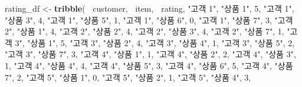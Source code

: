 \documentclass[]{book}
\newenvironment{Shaded}{\begin{snugshade}}{\end{snugshade}}
\newcommand{\DecValTok}[1]{\textcolor[rgb]{0.00,0.00,0.81}{#1}}
\newcommand{\KeywordTok}[1]{\textcolor[rgb]{0.13,0.29,0.53}{\textbf{#1}}}
\newcommand{\NormalTok}[1]{#1}
\newcommand{\OperatorTok}[1]{\textcolor[rgb]{0.81,0.36,0.00}{\textbf{#1}}}
\newcommand{\StringTok}[1]{\textcolor[rgb]{0.31,0.60,0.02}{#1}}
\begin{document}
\begin{Shaded}
\begin{Highlighting}[]
\NormalTok{rating_df <-}\StringTok{ }\KeywordTok{tribble}\NormalTok{(}
  \OperatorTok{~}\NormalTok{customer, }\OperatorTok{~}\NormalTok{item, }\OperatorTok{~}\NormalTok{rating,}
  \StringTok{"고객 1"}\NormalTok{, }\StringTok{"상품 1"}\NormalTok{, }\DecValTok{5}\NormalTok{,}
  \StringTok{"고객 1"}\NormalTok{, }\StringTok{"상품 3"}\NormalTok{, }\DecValTok{4}\NormalTok{,}
  \StringTok{"고객 1"}\NormalTok{, }\StringTok{"상품 5"}\NormalTok{, }\DecValTok{1}\NormalTok{,}
  \StringTok{"고객 1"}\NormalTok{, }\StringTok{"상품 6"}\NormalTok{, }\DecValTok{0}\NormalTok{,}
  \StringTok{"고객 1"}\NormalTok{, }\StringTok{"상품 7"}\NormalTok{, }\DecValTok{3}\NormalTok{,}
  \StringTok{"고객 2"}\NormalTok{, }\StringTok{"상품 1"}\NormalTok{, }\DecValTok{4}\NormalTok{,}
  \StringTok{"고객 2"}\NormalTok{, }\StringTok{"상품 2"}\NormalTok{, }\DecValTok{4}\NormalTok{,}
  \StringTok{"고객 2"}\NormalTok{, }\StringTok{"상품 3"}\NormalTok{, }\DecValTok{4}\NormalTok{,}
  \StringTok{"고객 2"}\NormalTok{, }\StringTok{"상품 7"}\NormalTok{, }\DecValTok{1}\NormalTok{,}
  \StringTok{"고객 3"}\NormalTok{, }\StringTok{"상품 1"}\NormalTok{, }\DecValTok{5}\NormalTok{,}
  \StringTok{"고객 3"}\NormalTok{, }\StringTok{"상품 2"}\NormalTok{, }\DecValTok{4}\NormalTok{,}
  \StringTok{"고객 3"}\NormalTok{, }\StringTok{"상품 4"}\NormalTok{, }\DecValTok{1}\NormalTok{,}
  \StringTok{"고객 3"}\NormalTok{, }\StringTok{"상품 5"}\NormalTok{, }\DecValTok{2}\NormalTok{,}
  \StringTok{"고객 3"}\NormalTok{, }\StringTok{"상품 7"}\NormalTok{, }\DecValTok{3}\NormalTok{,}
  \StringTok{"고객 4"}\NormalTok{, }\StringTok{"상품 1"}\NormalTok{, }\DecValTok{1}\NormalTok{,}
  \StringTok{"고객 4"}\NormalTok{, }\StringTok{"상품 2"}\NormalTok{, }\DecValTok{2}\NormalTok{,}
  \StringTok{"고객 4"}\NormalTok{, }\StringTok{"상품 3"}\NormalTok{, }\DecValTok{1}\NormalTok{,}
  \StringTok{"고객 4"}\NormalTok{, }\StringTok{"상품 4"}\NormalTok{, }\DecValTok{4}\NormalTok{,}
  \StringTok{"고객 4"}\NormalTok{, }\StringTok{"상품 5"}\NormalTok{, }\DecValTok{3}\NormalTok{,}
  \StringTok{"고객 4"}\NormalTok{, }\StringTok{"상품 6"}\NormalTok{, }\DecValTok{5}\NormalTok{,}
  \StringTok{"고객 4"}\NormalTok{, }\StringTok{"상품 7"}\NormalTok{, }\DecValTok{2}\NormalTok{,}
  \StringTok{"고객 5"}\NormalTok{, }\StringTok{"상품 1"}\NormalTok{, }\DecValTok{0}\NormalTok{,}
  \StringTok{"고객 5"}\NormalTok{, }\StringTok{"상품 2"}\NormalTok{, }\DecValTok{1}\NormalTok{,}
  \StringTok{"고객 5"}\NormalTok{, }\StringTok{"상품 4"}\NormalTok{, }\DecValTok{3}\NormalTok{,}

\end{Highlighting}
\end{Shaded}
\end{document}
